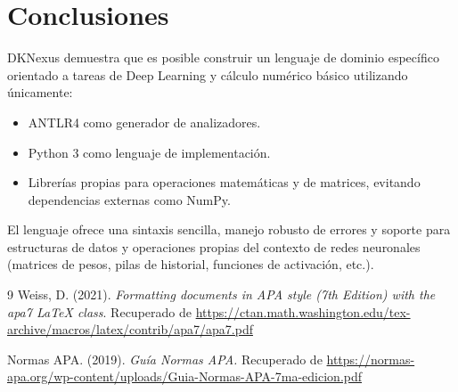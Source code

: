 \documentclass[stu, 12pt, letterpaper, donotrepeattitle, floatsintext, natbib]{apa7}
\begin{document}
\section{\large Conclusiones}

DKNexus demuestra que es posible construir un lenguaje de dominio específico orientado a tareas de Deep Learning y cálculo numérico básico utilizando únicamente:
\begin{itemize}
  \item ANTLR4 como generador de analizadores.
  \item Python 3 como lenguaje de implementación.
  \item Librerías propias para operaciones matemáticas y de matrices, evitando dependencias externas como NumPy.
\end{itemize}

El lenguaje ofrece una sintaxis sencilla, manejo robusto de errores y soporte para estructuras de datos y operaciones propias del contexto de redes neuronales (matrices de pesos, pilas de historial, funciones de activación, etc.).

\newpage
\renewcommand\refname{\large\textbf{Referencias}}
\begin{thebibliography}{9}
Weiss, D. (2021).
\textit{Formatting documents in APA style (7th Edition) with the apa7 LaTeX class}.
Recuperado de \url{https://ctan.math.washington.edu/tex-archive/macros/latex/contrib/apa7/apa7.pdf}

Normas APA. (2019).
\textit{Guía Normas APA.}
Recuperado de \url{https://normas-apa.org/wp-content/uploads/Guia-Normas-APA-7ma-edicion.pdf}
\end{thebibliography}
\end{document}
